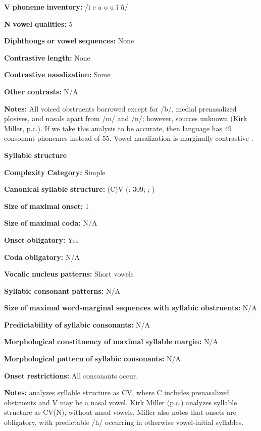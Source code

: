 \begin{styleBody}
\textbf{V} \textbf{phoneme} \textbf{inventory:} /i e a o u ĩ ũ/

\textbf{N} \textbf{vowel} \textbf{qualities:} 5

\textbf{Diphthongs} \textbf{or} \textbf{vowel} \textbf{sequences:} None

\textbf{Contrastive} \textbf{length:} None

\textbf{Contrastive} \textbf{nasalization:} Some

\textbf{Other} \textbf{contrasts:} N/A

\textbf{Notes:} All voiced obstruents borrowed except for /b/, medial prenasalized plosives, and nasals apart from /m/ and /n/; however, sources unknown (Kirk Miller, p.c.). If we take this analysis to be accurate, then language has 49 consonant phonemes instead of 55. Vowel nasalization is marginally contrastive \citep[38]{Sands2013}.

\textbf{Syllable} \textbf{structure}

\textbf{Complexity} \textbf{Category:} Simple

\textbf{Canonical} \textbf{syllable} \textbf{structure:} (C)V (\citealt{TuckerEtAl1977}: 309; \citealt{SandsEtAl1996}; \citealt{Sands2013})

\textbf{Size} \textbf{of} \textbf{maximal} \textbf{onset:} 1

\textbf{Size} \textbf{of} \textbf{maximal} \textbf{coda:} N/A

\textbf{Onset} \textbf{obligatory:} Yes

\textbf{Coda} \textbf{obligatory:} N/A

\textbf{Vocalic} \textbf{nucleus} \textbf{patterns:} Short vowels

\textbf{Syllabic} \textbf{consonant} \textbf{patterns:} N/A

\textbf{Size} \textbf{of} \textbf{maximal} \textbf{word{}-marginal sequences with syllabic obstruents:} N/A

\textbf{Predictability} \textbf{of} \textbf{syllabic} \textbf{consonants:} N/A

\textbf{Morphological} \textbf{constituency} \textbf{of} \textbf{maximal} \textbf{syllable} \textbf{margin:} N/A

\textbf{Morphological} \textbf{pattern} \textbf{of} \textbf{syllabic} \textbf{consonants:} N/A

\textbf{Onset} \textbf{restrictions:} All consonants occur.

\textbf{Notes:} \citet{Sands2013} analyzes syllable structure as CV, where C includes prenasalized obstruents and V may be a nasal vowel. Kirk Miller (p.c.) analyzes syllable structure as CV(N), without nasal vowels. Miller also notes that onsets are obligatory, with predictable /h/ occurring in otherwise vowel-initial syllables.


\end{styleBody}
